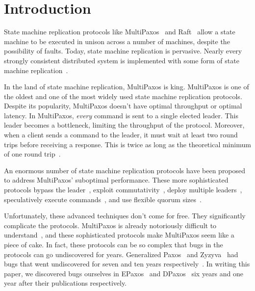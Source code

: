 \section{Introduction}
State machine replication protocols like MultiPaxos~\cite{lamport1998part,
lamport2001paxos} and Raft~\cite{ongaro2014search} allow a state machine to be
executed in unison across a number of machines, despite the possibility of
faults. Today, state machine replication is pervasive. Nearly every strongly
consistent distributed system is implemented with some form of state machine
replication~\cite{corbett2013spanner, thomson2012calvin, hunt2010zookeeper,
burrows2006chubby, baker2011megastore}.
%

In the land of state machine replication, MultiPaxos is king. MultiPaxos is one
of the oldest and one of the most widely used state machine replication
protocols. Despite its popularity, MultiPaxos doesn't have optimal throughput
or optimal latency. In MultiPaxos, \emph{every} command is sent to a single
elected leader. This leader becomes a bottleneck, limiting the throughput of
the protocol. Moreover, when a client sends a command to the leader, it must
wait at least two round trips before receiving a response. This is twice as
long as the theoretical minimum of one round trip~\cite{lamport2006lower}.

An enormous number of state machine replication protocols have been proposed to
address MultiPaxos' suboptimal performance. These more sophisticated protocols
%
bypass the leader~\cite{lamport2006fast, ports2015designing, li2016just},
%
exploit commutativity~\cite{lamport2005generalized, moraru2013there,
arun2017speeding, park2019exploiting},
%
deploy multiple leaders~\cite{mao2008mencius, moraru2013there,
arun2017speeding},
%
speculatively execute commands~\cite{ports2015designing, li2016just,
park2019exploiting},
%
and use flexible quorum sizes~\cite{howard2016flexible, nawab2018dpaxos}.

Unfortunately, these advanced techniques don't come for free. They
significantly complicate the protocols. MultiPaxos is already notoriously
difficult to understand~\cite{van2015paxos, ongaro2014search}, and these
sophisticated protocols make MultiPaxos seem like a piece of cake. In fact,
these protocols can be so complex that bugs in the protocols can go
undiscovered for years. Generalized Paxos~\cite{lamport2005generalized} and
Zyzyva~\cite{kotla2007zyzzyva} had bugs that went undiscovered for seven and
ten years respectively~\cite{sutra2011fast, abraham2017revisiting}. In writing
this paper, we discovered bugs ourselves in EPaxos~\cite{moraru2013there} and
DPaxos~\cite{nawab2018dpaxos} six years and one year after their publications
respectively.
%

